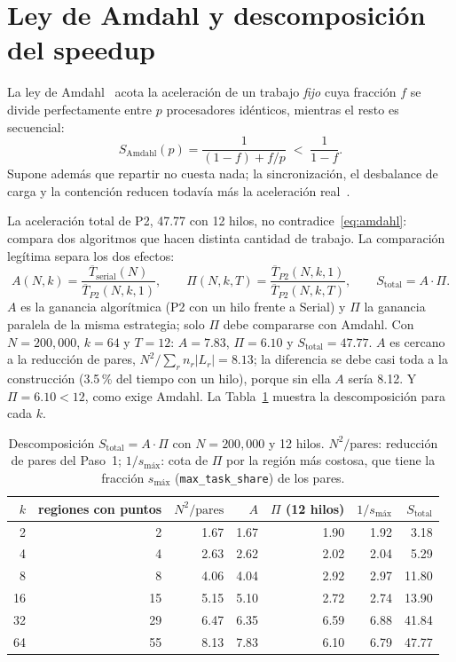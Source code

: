 \documentclass[11pt,letterpaper]{article}
\newcommand{\code}[1]{\texttt{#1}}
\newcommand{\Tser}{\overline{T}_{\mathrm{serial}}}
\newcommand{\smax}{s_{\text{máx}}}
\begin{document}
\section{Ley de Amdahl y descomposición del speedup}\label{sec:amdahl}

La ley de Amdahl~\cite{amdahl1967,diapositivas} acota la aceleración de un trabajo \emph{fijo} cuya fracción $f$ se
divide perfectamente entre $p$ procesadores idénticos, mientras el resto es secuencial:
\begin{equation}\label{eq:amdahl}
  S_{\mathrm{Amdahl}}(p)=\frac{1}{(1-f)+f/p}\;<\;\frac{1}{1-f}.
\end{equation}
Supone además que repartir no cuesta nada; la sincronización, el desbalance de carga y la contención reducen todavía
más la aceleración real~\cite{diapositivas}.

La aceleración total de P2, 47.77 con 12 hilos, no contradice~\eqref{eq:amdahl}: compara dos algoritmos que hacen
distinta cantidad de trabajo. La comparación legítima separa los dos efectos:
\begin{equation}\label{eq:descomp}
  A(N,k)=\frac{\Tser(N)}{\overline T_{P2}(N,k,1)},\qquad
  \Pi(N,k,T)=\frac{\overline T_{P2}(N,k,1)}{\overline T_{P2}(N,k,T)},\qquad
  S_{\mathrm{total}}=A\cdot\Pi .
\end{equation}
$A$ es la ganancia algorítmica (P2 con un hilo frente a Serial) y $\Pi$ la ganancia paralela de la misma
estrategia; solo $\Pi$ debe compararse con Amdahl. Con $N=200{,}000$, $k=64$ y $T=12$: $A=7.83$, $\Pi=6.10$ y
$S_{\mathrm{total}}=47.77$. $A$ es cercano a la reducción de pares, $N^2/\sum_r n_r|L_r|=8.13$; la diferencia se debe casi toda a la construcción (3.5\,\% del tiempo con un hilo), porque sin ella $A$ sería 8.12. Y $\Pi=6.10<12$, como exige
Amdahl. La Tabla~\ref{tab:amdahl} muestra la descomposición para cada $k$.

\begin{table}[t]
\centering\small
\caption{Descomposición $S_{\mathrm{total}}=A\cdot\Pi$ con $N=200{,}000$ y 12 hilos. $N^2/\text{pares}$: reducción de
pares del Paso~1; $1/\smax$: cota de $\Pi$ por la región más costosa, que tiene la fracción $\smax$
(\code{max\_task\_share}) de los pares.}
\label{tab:amdahl}
\begin{tabular}{@{}rrrrrrr@{}}
\toprule
$k$ & regiones con puntos & $N^2/\text{pares}$ & $A$ & $\Pi$ (12 hilos) & $1/\smax$ & $S_{\mathrm{total}}$\\
\midrule
 2 &  2 & 1.67 & 1.67 & 1.90 & 1.92 &  3.18\\
 4 &  4 & 2.63 & 2.62 & 2.02 & 2.04 &  5.29\\
 8 &  8 & 4.06 & 4.04 & 2.92 & 2.97 & 11.80\\
16 & 15 & 5.15 & 5.10 & 2.72 & 2.74 & 13.90\\
32 & 29 & 6.47 & 6.35 & 6.59 & 6.88 & 41.84\\
64 & 55 & 8.13 & 7.83 & 6.10 & 6.79 & 47.77\\
\bottomrule
\end{tabular}
\end{table}
\end{document}
